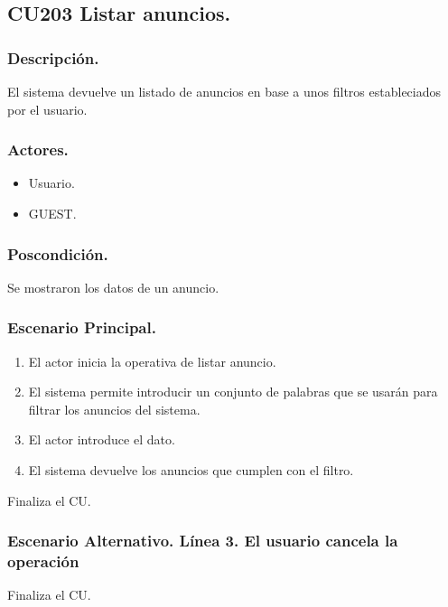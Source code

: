 \subsection{CU203 Listar anuncios.}
\subsubsection{Descripci\'{o}n.}
El sistema devuelve un listado de anuncios en base a unos filtros estableciados por el usuario.
\subsubsection{Actores.}
\begin{itemize}
\item Usuario.
\item GUEST.
\end{itemize}
\subsubsection{Poscondici\'{o}n.}
Se mostraron los datos de un anuncio.
\subsubsection{Escenario Principal.}
\begin{enumerate}
\item El actor inicia la operativa de listar anuncio.
\item El sistema permite introducir un conjunto de palabras que se usar\'{a}n para filtrar los anuncios del sistema.
\item El actor introduce el dato.
\item El sistema devuelve los anuncios que cumplen con el filtro.
\end{enumerate}
Finaliza el CU.
\subsubsection{Escenario Alternativo. L\'{i}nea 3. El usuario cancela la operaci\'{o}n}
Finaliza el CU.